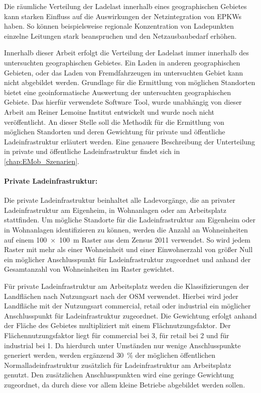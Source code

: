 Die räumliche Verteilung der Ladelast innerhalb eines geographischen Gebietes kann starken Einfluss auf die Auswirkungen der Netzintegration von \glspl{EPKW} haben.
So können beispielsweise regionale Konzentration von Ladepunkten einzelne Leitungen stark beanspruchen und den Netzausbaubedarf erhöhen.\medskip

Innerhalb dieser Arbeit erfolgt die Verteilung der Ladelast immer innerhalb des untersuchten geographischen Gebietes.
Ein Laden in anderen geographischen Gebieten, oder das Laden von \glqq Fremdfahrzeugen\grqq{} im untersuchten Gebiet kann nicht abgebildet werden.
Grundlage für die Ermittlung von möglichen Standorten bietet eine geoinformatische Auswertung der untersuchten geographischen Gebiete.
Das hierfür verwendete Software Tool, wurde unabhängig von dieser Arbeit am Reiner Lemoine Institut entwickelt und wurde noch nicht veröffentlicht.
An dieser Stelle soll die Methodik für die Ermittlung von möglichen Standorten und deren Gewichtung für private und öffentliche Ladeinfrastruktur erläutert werden.
Eine genauere Beschreibung der Unterteilung in private und öffentliche Ladeinfrastruktur findet sich in \autoref{chap:EMob_Szenarien}.


\paragraph{Private Ladeinfrastruktur:}

Die private Ladeinfrastruktur beinhaltet alle Ladevorgänge, die an privater Ladeinfrastruktur am Eigenheim, in Wohnanlagen oder am Arbeitsplatz stattfinden.
Um mögliche Standorte für die Ladeinfrastruktur am Eigenheim oder in Wohnanlagen identifizieren zu können, werden die Anzahl an Wohneinheiten auf einem \SI{100 x 100}{\m} Raster aus dem Zensus 2011 \cite{StatistischesBundesamt2011} verwendet.
So wird jedem Raster mit mehr als einer Wohneinheit und einer Einwohnerzahl von größer Null ein möglicher Anschlusspunkt für Ladeinfrastruktur zugeordnet und anhand der Gesamtanzahl von Wohneinheiten im Raster gewichtet.\medskip

Für private Ladeinfrastruktur am Arbeitsplatz werden die Klassifizierungen der Landflächen nach Nutzungsart nach der \gls{OSM} \cite{OpenStreetMapFoundation} verwendet.
Hierbei wird jeder Landfläche mit der Nutzungsart \glqq commercial\grqq , \glqq retail\grqq{} oder \glqq industrial\grqq{} ein möglicher Anschlusspunkt für Ladeinfrastruktur zugeordnet.
Die Gewichtung erfolgt anhand der Fläche des Gebietes multipliziert mit einem Flächnutzungsfaktor.
Der Flächennutzungsfaktor liegt für \glqq commercial\grqq{} bei \num{3}, für \glqq retail\grqq{} bei \num{2} und für \glqq industrial\grqq{} bei \num{1}.
Da hierdurch unter Umständen nur wenige Anschlusspunkte generiert werden, werden ergänzend \SI{30}{\percent} der möglichen öffentlichen Normalladeinfrastruktur zusätzlich für Ladeinfrastruktur am Arbeitsplatz genutzt.
Den zusätzlichen Anschlusspunkten wird eine geringe Gewichtung zugeordnet, da durch diese vor allem kleine Betriebe abgebildet werden sollen.


